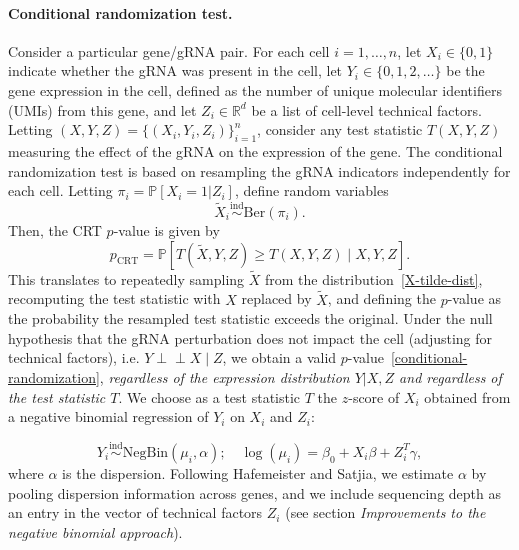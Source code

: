 \documentclass{nature}
\newcommand\independent{\perp \!\!\! \perp}
\begin{document}
\paragraph{Conditional randomization test.}
Consider a particular gene/gRNA pair. For each cell $i = 1, \dots, n$, let $X_i \in \{0,1\}$ indicate whether the gRNA was present in the cell, let $Y_i \in \{0,1,2,\dots\}$ be the gene expression in the cell, defined as the number of unique molecular identifiers (UMIs) from this gene, and let $Z_i \in \mathbb R^d$ be a list of cell-level technical factors. Letting $(X, Y, Z) = \{(X_i, Y_i, Z_i)\}_{i = 1}^{n}$, consider any test statistic $T(X,Y,Z)$ measuring the effect of the gRNA on the expression of the gene. The conditional randomization test\cite{CetL16} is based on resampling the gRNA indicators independently for each cell. Letting $\pi_i = \mathbb P[X_i = 1 | Z_i]$, define random variables
\begin{equation}
\widetilde X_i \overset{\text{ind}}\sim \text{Ber}(\pi_i). 
\label{X-tilde-dist}
\end{equation}
Then, the CRT $p$-value is given by
\begin{equation}
p_{\text{CRT}} = \mathbb P[T(\widetilde X, Y, Z) \geq T(X,Y,Z)\mid X,Y,Z].
\label{conditional-randomization}
\end{equation}
This translates to repeatedly sampling $\widetilde X$ from the distribution~\eqref{X-tilde-dist}, recomputing the test statistic with $X$ replaced by $\widetilde X$, and defining the $p$-value as the probability the resampled test statistic exceeds the original. Under the null hypothesis that the gRNA perturbation does not impact the cell (adjusting for technical factors), i.e. $Y \independent X \mid Z$, we obtain a valid $p$-value~\eqref{conditional-randomization}, \textit{regardless of the expression distribution $Y|X,Z$ and regardless of the test statistic $T$}. We choose as a test statistic $T$ the $z$-score of $X_i$ obtained from a negative binomial regression of $Y_i$ on $X_i$ and $Z_i$:

\begin{equation}
Y_i \overset{\text{ind}} \sim \text{NegBin}(\mu_i, \alpha); \quad \log(\mu_i) = \beta_0 + X_i \beta + Z_i^T \gamma
\label{negative-binomial},
\end{equation}
where $\alpha$ is the dispersion. Following Hafemeister and Satjia\cite{Hafemeister2019}, we estimate $\alpha$ by pooling dispersion information across genes, and we include sequencing depth as an entry in the vector of technical factors  $Z_i$ (see section \textit{Improvements to the negative binomial approach}).
\end{document}
